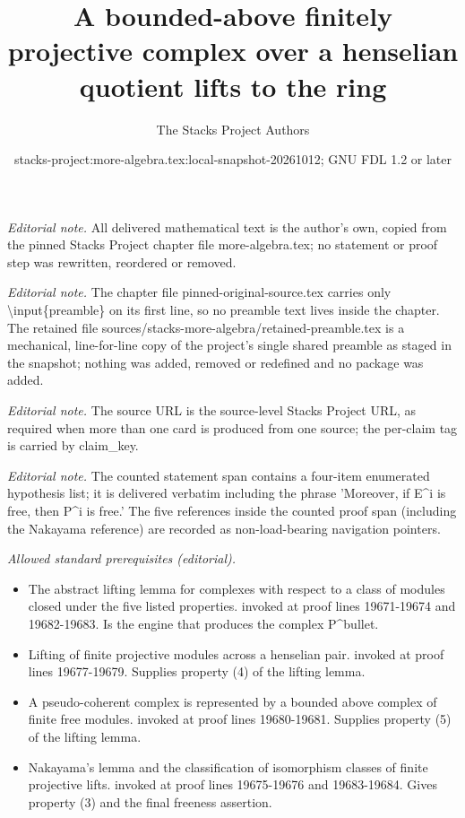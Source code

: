 \documentclass[10pt,a4paper]{amsart}
\title{A bounded-above finitely projective complex over a henselian quotient lifts to the ring}
\author{The Stacks Project Authors}
\date{stacks-project:more-algebra.tex:local-snapshot-20261012; GNU FDL 1.2 or later}
\theoremstyle{plain}
\theoremstyle{definition}
\theoremstyle{remark}
\numberwithin{equation}{subsection}
\begin{document}
\maketitle
\setcounter{subsection}{1}
\noindent\textit{Editorial note.} All delivered mathematical text is the author's own, copied from the pinned Stacks Project chapter file more-algebra.tex; no statement or proof step was rewritten, reordered or removed.\par\medskip
\noindent\textit{Editorial note.} The chapter file pinned-original-source.tex carries only \textbackslash{}input\{preamble\} on its first line, so no preamble text lives inside the chapter. The retained file sources/stacks-more-algebra/retained-preamble.tex is a mechanical, line-for-line copy of the project's single shared preamble as staged in the snapshot; nothing was added, removed or redefined and no package was added.\par\medskip
\noindent\textit{Editorial note.} The source URL is the source-level Stacks Project URL, as required when more than one card is produced from one source; the per-claim tag is carried by claim\_key.\par\medskip
\noindent\textit{Editorial note.} The counted statement span contains a four-item enumerated hypothesis list; it is delivered verbatim including the phrase 'Moreover, if E\textasciicircum{}i is free, then P\textasciicircum{}i is free.' The five references inside the counted proof span (including the Nakayama reference) are recorded as non-load-bearing navigation pointers.\par\medskip
\noindent\textit{Allowed standard prerequisites (editorial).}\begin{itemize}
\item The abstract lifting lemma for complexes with respect to a class of modules closed under the five listed properties. invoked at proof lines 19671-19674 and 19682-19683. Is the engine that produces the complex P\textasciicircum{}bullet.
\item Lifting of finite projective modules across a henselian pair. invoked at proof lines 19677-19679. Supplies property (4) of the lifting lemma.
\item A pseudo-coherent complex is represented by a bounded above complex of finite free modules. invoked at proof lines 19680-19681. Supplies property (5) of the lifting lemma.
\item Nakayama's lemma and the classification of isomorphism classes of finite projective lifts. invoked at proof lines 19675-19676 and 19683-19684. Gives property (3) and the final freeness assertion.
\end{itemize}\medskip
\end{document}
